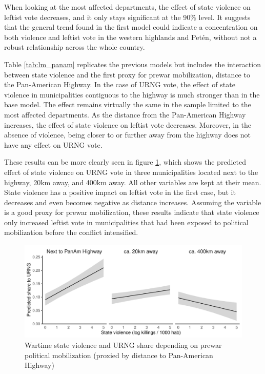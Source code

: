 \documentclass[12pt, notitlepage]{article}
\begin{document}



When looking at the most affected departments, the effect of state violence on leftist vote decreases, and it only stays significant at the 90\% level.
It suggests that the general trend found in the first model could indicate a concentration on both violence and leftist vote in the western highlands and Petén, without not a robust relationship across the whole country.

Table \ref{tab:lm_panam} replicates the previous models but includes the interaction between state violence and the first proxy for prewar mobilization, distance to the Pan-American Highway.
In the case of URNG vote, the effect of state violence in municipalities contiguous to the highway is much stronger than in the base model.
The effect remains virtually the same in the sample limited to the most affected departments.
As the distance from the Pan-American Highway increases, the effect of state violence on leftist vote decreases.
Moreover, in the absence of violence, being closer to or further away from the highway does not have any effect on URNG vote.



These results can be more clearly seen in figure \ref{fig:pp_URNG_panam}, which shows the predicted effect of state violence on URNG vote in three municipalities located next to the highway, 20km away, and 400km away.
All other variables are kept at their mean.
State violence has a positive impact on leftist vote in the first case, but it decreases and even becomes negative as distance increases.
Assuming the variable is a good proxy for prewar mobilization, these results indicate that state violence only increased leftist vote in municipalities that had been exposed to political mobilization before the conflict intensified.

\begin{figure}[htb!]
  \centering
    \includegraphics[width = .75\textwidth]{img/pp_URNG_panam}

  \caption{Wartime state violence and URNG share depending on prewar political mobilization (proxied by distance to Pan-American Highway)} \label{fig:pp_URNG_panam}


\end{figure}
\end{document}
